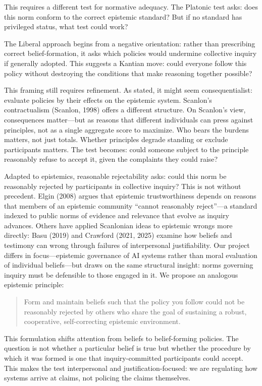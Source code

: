 This requires a different test for normative adequacy. The Platonic test
asks: does this norm conform to the correct epistemic standard? But if
no standard has privileged status, what test could work?

The Liberal approach begins from a negative orientation: rather than
prescribing correct belief-formation, it asks which policies would
undermine collective inquiry if generally adopted. This suggests a
Kantian move: could everyone follow this policy without destroying the
conditions that make reasoning together possible?

This framing still requires refinement. As stated, it might seem
consequentialist: evaluate policies by their effects on the epistemic
system. Scanlon's contractualism (Scanlon, 1998) offers a different
structure. On Scanlon's view, consequences matter---but as reasons that
different individuals can press against principles, not as a single
aggregate score to maximize. Who bears the burdens matters, not just
totals. Whether principles degrade standing or exclude participants
matters. The test becomes: could someone subject to the principle
reasonably refuse to accept it, given the complaints they could raise?

Adapted to epistemics, reasonable rejectability asks: could this norm be
reasonably rejected by participants in collective inquiry? This is not
without precedent. Elgin (2008) argues that epistemic trustworthiness
depends on reasons that members of an epistemic community ``cannot
reasonably reject''---a standard indexed to public norms of evidence and
relevance that evolve as inquiry advances. Others have applied
Scanlonian ideas to epistemic wrongs more directly: Basu (2019) and
Crawford (2021, 2025) examine how beliefs and testimony can wrong
through failures of interpersonal justifiability. Our project differs in
focus---epistemic governance of AI systems rather than moral evaluation
of individual beliefs---but draws on the same structural insight: norms
governing inquiry must be defensible to those engaged in it. We propose
an analogous epistemic principle:

\begin{quote}
Form and maintain beliefs such that the policy you follow could not be
reasonably rejected by others who share the goal of sustaining a robust,
cooperative, self-correcting epistemic environment.
\end{quote}

This formulation shifts attention from beliefs to belief-forming
policies. The question is not whether a particular belief is true but
whether the procedure by which it was formed is one that
inquiry-committed participants could accept. This makes the test
interpersonal and justification-focused: we are regulating how systems
arrive at claims, not policing the claims themselves.

